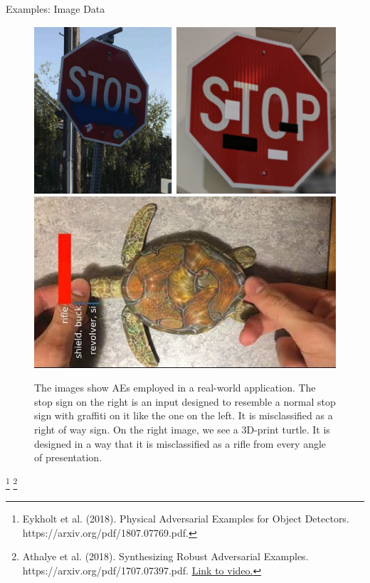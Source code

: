 \documentclass[11pt,compress,t,notes=noshow, xcolor=table]{beamer}
\begin{document}
\begin{vbframe}{Examples: Image Data}
\begin{figure}[h]
\centering
\includegraphics[width=0.46\linewidth]{figure/AEstop.png}\quad \includegraphics[width=0.45\linewidth]{figure/AEturtle.jpg}
  \caption{The images show AEs employed in a real-world application. The stop sign on the right is an input designed to resemble a normal stop sign with graffiti on it like the one on the left. It is misclassified as a right of way sign. On the right image, we see a 3D-print turtle. It is designed in a way that it is misclassified as a rifle from every angle of presentation.} 
  \label{fig:mnist}
\end{figure} 

\footnote[frame]{Eykholt et al. (2018). Physical Adversarial Examples for Object Detectors. https://arxiv.org/pdf/1807.07769.pdf.} 
\footnote[frame]{Athalye et al. (2018). Synthesizing Robust Adversarial Examples. https://arxiv.org/pdf/1707.07397.pdf. \href{https://www.youtube.com/watch?v=piYnd_wYlT8}{Link to video.}}

\end{vbframe}
\end{document}
